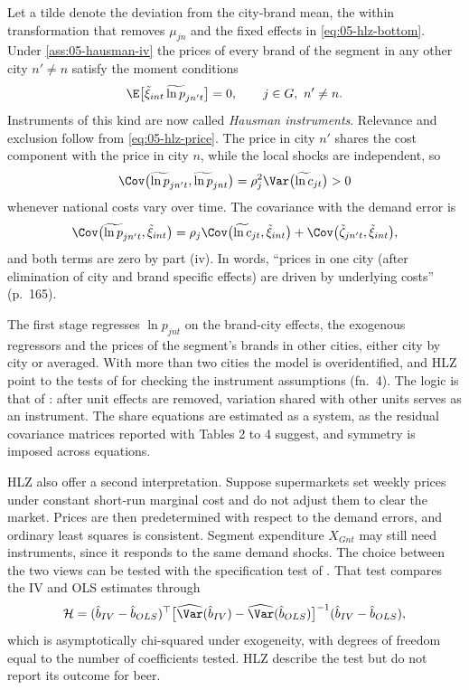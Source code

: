 Let a tilde denote the deviation from the city-brand mean, the within transformation that removes $\mu_{jn}$
and the fixed effects in \eqref{eq:05-hlz-bottom}. Under \cref{ass:05-hausman-iv} the prices of every brand of
the segment in any other city $n'\neq n$ satisfy the moment conditions
\begin{equation}\label{eq:05-hausman-iv}
  \E\bigl[\tilde\xi_{int}\,\widetilde{\ln p}_{jn't}\bigr] = 0, \qquad j\in G,\ n'\neq n.
\end{equation}
Instruments of this kind are now called \emph{Hausman instruments}. Relevance and exclusion follow from
\eqref{eq:05-hlz-price}. The price in city $n'$ shares the cost component with the price in city $n$, while the
local shocks are independent, so
\begin{equation*}
  \Cov\bigl(\widetilde{\ln p}_{jn't},\widetilde{\ln p}_{jnt}\bigr) = \rho_j^2\Var\bigl(\widetilde{\ln c}_{jt}\bigr) > 0
\end{equation*}
whenever national costs vary over time. The covariance with the demand error is
\begin{equation*}
  \Cov\bigl(\widetilde{\ln p}_{jn't},\tilde\xi_{int}\bigr)
  = \rho_j\Cov\bigl(\widetilde{\ln c}_{jt},\tilde\xi_{int}\bigr) + \Cov\bigl(\tilde\zeta_{jn't},\tilde\xi_{int}\bigr),
\end{equation*}
and both terms are zero by part (iv). In words, ``prices in one city (after elimination of city and brand specific effects)
are driven by underlying costs'' (p.~165).

The first stage regresses $\ln p_{jnt}$ on the brand-city effects, the exogenous regressors and the prices of the
segment's brands in other cities, either city by city or averaged. With more than two cities the model is
overidentified, and HLZ point to the tests of \citet{HausmanTaylor1981} for checking the instrument assumptions
(fn.~4). The logic is that of \citet{HausmanTaylor1981}: after unit effects are removed, variation shared with
other units serves as an instrument. The share equations are estimated as a system, as the residual covariance
matrices reported with Tables 2 to 4 suggest, and symmetry is imposed across equations.

HLZ also offer a second interpretation. Suppose supermarkets set weekly prices under constant short-run marginal
cost and do not adjust them to clear the market. Prices are then predetermined with respect to the demand errors,
and ordinary least squares is consistent. Segment expenditure $X_{Gnt}$ may still need instruments, since it
responds to the same demand shocks. The choice between the two views can be tested with the specification test
of \citet{Hausman1978}. That test compares the IV and OLS estimates through
\begin{equation*}
  \mathcal{H} = (\hat b_{IV} - \hat b_{OLS})^\top\bigl[\widehat{\Var}(\hat b_{IV}) - \widehat{\Var}(\hat b_{OLS})\bigr]^{-1}(\hat b_{IV} - \hat b_{OLS}),
\end{equation*}
which is asymptotically chi-squared under exogeneity, with degrees of freedom equal to the number of
coefficients tested. HLZ describe the test but do not report its outcome for beer.

